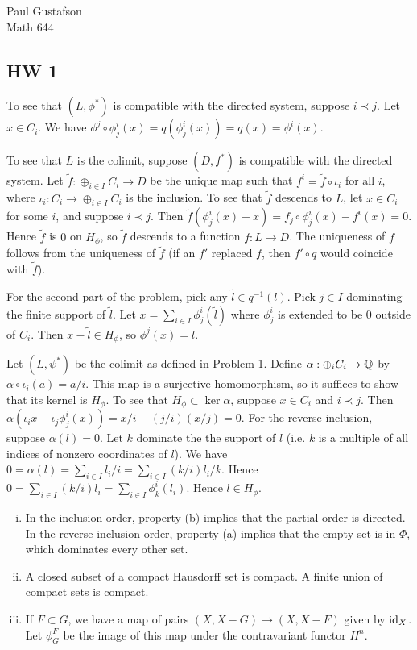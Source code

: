 \documentclass{article}
\begin{document}
\noindent Paul Gustafson\\
\noindent Math 644

\subsection*{HW 1}
 To see that $(L, \phi^*)$ is compatible with the directed system, suppose $i \prec j$. Let $x \in C_i$. We have $\phi^j \circ \phi^i_j(x) = q(\phi^i_j(x)) = q(x) = \phi^i(x)$.

To see that $L$ is the colimit, suppose $(D, f^*)$ is compatible with the directed system. Let $\widetilde f: \oplus_{i \in I} C_i \to D$ be the unique map such that $f^i = \widetilde f \circ \iota_i$ for all $i$, where $\iota_i: C_i \to \oplus_{i \in I} C_i$ is the inclusion.   To see that $\widetilde f$ descends to $L$, let $x \in C_i$ for some $i$, and suppose $i \prec j$.  Then $\widetilde f(\phi^i_j(x) - x) = f_j \circ \phi^i_j (x) - f^i(x) = 0$.  Hence $\widetilde f$ is $0$ on $H_\phi$, so $\widetilde f$ descends to a function $f: L \to D$. The uniqueness of $f$ follows from the uniqueness of $\widetilde f$ (if an $f'$ replaced $f$, then $f' \circ q$ would coincide with $\widetilde f$).

For the second part of the problem, pick any $\widetilde l \in q^{-1}(l)$.  Pick $j \in I$ dominating the finite support of $\widetilde l$. Let $x = \sum_{i \in I} \phi^i_j(\widetilde l)$ where $\phi^i_j$ is extended to be 0 outside of $C_i$. Then $x - \widetilde l \in H_\phi$, so $\phi^j(x) = l$.

 Let $(L, \psi^*)$ be the colimit as defined in Problem 1.  Define $\alpha: \oplus_i C_i \to \mathbb{Q}$ by $\alpha \circ \iota_i(a) = a/i$. This map is a surjective homomorphism, so it suffices to show that its kernel is $H_\phi$. To see that $H_\phi \subset \ker \alpha$, suppose $x \in C_i$ and $i \prec j$.   Then $\alpha(\iota_i x - \iota_j \phi^i_j(x)) = x/i - (j/i)  (x/j) = 0$.  For the reverse inclusion, suppose $\alpha(l) = 0$.  Let $k$ dominate the the support of $l$ (i.e. $k$ is a multiple of all indices of nonzero coordinates of $l$).  We have $0 = \alpha(l) = \sum_{i \in I}  l_i/i= \sum_{i \in I}  (k/i) l_i /k$. Hence $0 = \sum_{i \in I} (k/i) l_i = \sum_{i \in I} \phi^i_k(l_i)$.  Hence $l \in H_\phi$.

 \begin{enumerate}[i.]
\item In the inclusion order, property (b) implies that the partial order is directed.  In the reverse inclusion order, property (a) implies that the empty set is in $\Phi$, which dominates every other set.

\item A closed subset of a compact Hausdorff set is compact. A finite union of compact sets is compact.

\item If $F \subset G$, we have a map of pairs $(X, X - G) \to (X, X - F)$ given by $\operatorname{id}_X$. Let $\phi^F_G$ be the image of this map under the contravariant functor $H^n$.  
\end{enumerate}
\end{document}
